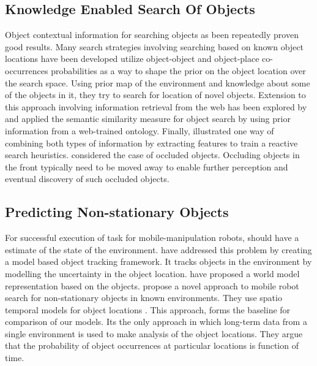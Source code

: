 \subsection{Knowledge Enabled Search Of Objects}
\label{sub:partially known objects}
Object contextual information for searching objects as been repeatedly proven good results. Many search strategies involving searching based on known object locations have been developed
\cite{kollar_utilizing_2009} utilize object-object and object-place co-occurrences probabilities as a way to shape the prior on the object location over the search space. Using prior map of the environment and knowledge about some of the objects in it, they try to search for location of novel objects.
Extension to this approach involving information retrieval from the web has been explored by \cite {samadi_using_2012} and
\cite{kunze_searching_2012} applied the semantic similarity measure for object search by using prior information from a web-trained ontology.
Finally, \cite{joho_learning_2011} illustrated one way of combining both types of information by extracting features to train a reactive search heuristics.
\cite{wong_using_2014} considered the case of occluded objects. Occluding objects in the front typically need to be moved away to enable further perception and eventual discovery of such occluded objects. 

\subsection{Predicting Non-stationary Objects}
For successful execution of task for mobile-manipulation robots, should have a estimate of the state of the environment. \cite{elfring_semantic_2013} have addressed this problem by creating a model based object tracking framework. It tracks objects in the environment by modelling the uncertainty in the object location.
\cite{wong_manipulation-based_2013} have proposed a world model representation based on the objects. 
\cite{krajnik_wheres_2015}  propose a novel  approach  to  mobile  robot
search  for  non-stationary  objects  in known  environments. They use spatio temporal models for object locations .
This approach, forms the baseline for comparison of our models. Its the only approach in which long-term data from a single environment is used to make analysis of the object locations. They argue that the  probability of object occurrences at particular locations is function of time.


